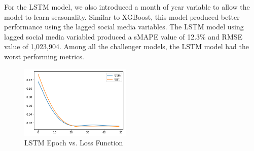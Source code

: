 \documentclass[12pt,oneside]{chicagocapstone}
\begin{document}
For the LSTM model, we also introduced a month of year variable to allow the model to learn seasonality. Similar to XGBoost, this model produced better performance using the lagged social media variables. The LSTM model using lagged social media variabled produced a sMAPE value of 12.3\% and RMSE value of 1,023,904. Among all the challenger models, the LSTM model had the worst performing metrics.
\begin{figure}

{\centering \includegraphics[width=200px,angle = 0, scale=1.5]{figure/image17} 

}

\caption{LSTM Epoch vs. Loss Function}\label{fig:image17}
\end{figure}
\end{document}
